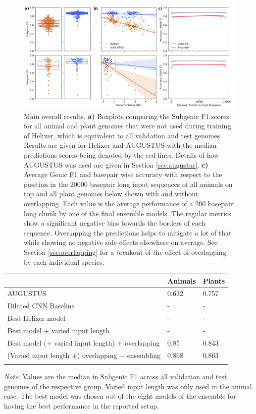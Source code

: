 \documentclass{bioinfo}
\begin{document}
\begin{figure}[!tpb]
\label{fig:results}
\centerline{\includegraphics[width=\textwidth]{images/main_results}}
\caption{Main overall results.  {\bf a)} Boxplots comparing the Subgenic F1 scores for all animal and plant genomes that were not used during training of Helixer, which is equivalent to all validation and test genomes. Results are given for Helixer and AUGUSTUS with the median predictions scores being denoted by the red lines. Details of how AUGUSTUS was used are given in Section \ref{sec:augustus}. {\bf c)} Average Genic F1 and basepair wise accuracy with respect to the position in the 20000 basepair long input sequences of all animals on top and all plant genomes below shown with and without overlapping. Each value is the average performance of a 200 basepair long chunk by one of the final ensemble models. The regular metrics show a significant negative bias towards the borders of each sequence. Overlapping the predictions helps to mitigate a lot of that while showing no negative side effects elsewhere on average. See Section \ref{sec:overlapping} for a breakout of the effect of overlapping by each individual species.}
\end{figure}

\begin{table}[!t]
 {
\begin{tabular}{@{}lll@{}}
\toprule & Animals & Plants\\
\midrule
AUGUSTUS & 0.632 & 0.757 \\
Dilated CNN Baseline & -  & - \\
Best Helixer model & -  & -  \\
Best model + varied input length & -  & - \\
Best model (+ varied input length) + overlapping &  0.85  & 0.843  \\
(Varied input length +) overlapping + ensembling & 0.868  & 0.863  \\
\botrule
\end{tabular}}{{\it Note:} Values are the median in Subgenic F1 across all validation and test genomes of the respective group. Varied input length was only used in the animal case. The best model was chosen out of the eight models of the ensemble for having the best performance in the reported setup.}
\end{table}
\end{document}

